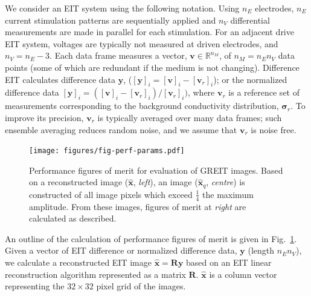 \documentclass[12pt]{iopart}
\newcommand{\vB}{\mbox{$\mathbf{v}$}}
\newcommand{\xH}{\mbox{$\mathbf{\hat x}$}}
\newcommand{\yB}{\mbox{$\mathbf{y}$}}
\newcommand{\RB}{\mbox{$\mathbf{R}$}}
\newcommand{\sG}{\mbox{${\boldsymbol \sigma}$}}
\begin{document}
We consider an EIT system using the following notation.
Using $n_E$ electrodes,  $n_E$ current stimulation
patterns are sequentially applied and $n_V$ differential
measurements are made in parallel for each stimulation.
 For an adjacent drive
EIT system, voltages are typically not measured at driven
electrodes, and $n_V = n_E - 3$.  Each data frame measures
a vector, $\vB\in\mathbb{R}^{n_M}$, of $n_M= n_E n_V$ data points
(some of which are redundant if the medium is not changing).
Difference EIT calculates difference data $\yB$, ($[\yB]_i =
[\vB]_i - [\vB_r]_i$); or the normalized difference data $[\yB]_i
= ([\vB]_i - [\vB_r]_i)/[\vB_r]_i)$, where $\vB_r$ is a reference
set of measurements corresponding to the background conductivity
distribution, $\sG_r$. To improve its precision,
$\vB_r$ is typically averaged over many data frames; 
such ensemble averaging reduces random noise, and we
 assume that $\vB_r$ is noise free.



\begin{figure}[bhtp]
\begin{center}
\texttt{[image: figures/fig-perf-params.pdf]}
\caption{ \label{fig:PerfFigures}
Performance figures of merit for evaluation of GREIT images.
Based on a reconstructed image ($\xH$, {\em left}),
an image ($\xH_q$, {\em centre})
is constructed of all image pixels which exceed
 $\frac{1}{4}$ the maximum amplitude. From these images,
figures of merit at {\em right} are calculated as described.
}
\end{center}
\end{figure}

An outline of the calculation of performance figures
of merit is given in Fig.\ \ref{fig:PerfFigures}.
Given a vector of EIT difference or normalized difference
data, $\yB$ (length $n_E n_V$), we calculate a 
reconstructed EIT image $\xH = \RB \yB$ based on
an EIT linear reconstruction algorithm represented as
a matrix $\RB$. $\xH$ is a column vector representing
the $32\times 32$ pixel grid of the images.
\end{document}
